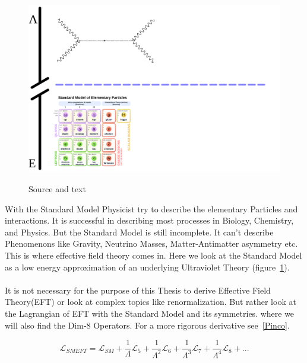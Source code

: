 \documentclass[../Bachelorarbeit.tex]{subfiles}
\begin{document}
\label{sec:EFT}

\begin{figure}[h]
    \centering
    \includegraphics[width=\textwidth]{images/EFT_Model.png}
    \label{fig:EFT_sketch}
    \caption{Source and text}
\end{figure}

With the Standard Model Physicist try to describe the elementary Particles and interactions. It is successful in describing most processes in Biology, Chemistry, and Physics.
But the Standard Model is still incomplete. It can't describe Phenomenons like Gravity, Neutrino Masses, Matter-Antimatter asymmetry etc. This is where effective field theory comes in.
Here we look at the Standard Model as a low energy approximation of an underlying Ultraviolet Theory (figure~\ref{fig:EFT_sketch}). 
\\\\
It is not necessary for the purpose of this Thesis to derive Effective Field Theory(EFT) or look at complex topics like renormalization. But rather look at the Lagrangian of EFT with the Standard Model and its symmetries.
where we will also find the Dim-8 Operators. For a more rigorous derivative see~\ref{Pinco}.

\begin{equation}
    \mathcal{L}_{SMEFT} = \mathcal{L}_{SM} + \frac{1}{\Lambda} \mathcal{L}_{5} + \frac{1}{\Lambda^2} \mathcal{L}_{6} + \frac{1}{\Lambda^3} \mathcal{L}_{7} + \frac{1}{\Lambda^4} \mathcal{L}_{8} + ...
\end{equation}
\end{document}
